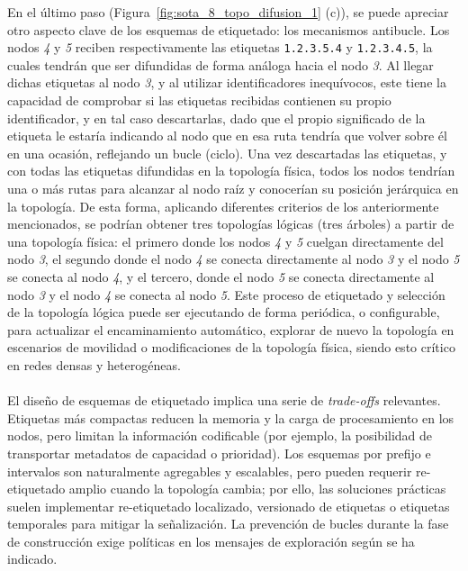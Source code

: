 En el último paso (Figura~\ref{fig:sota_8_topo_difusion_1} (c)), se puede apreciar otro aspecto clave de los esquemas de etiquetado: los mecanismos antibucle. Los nodos \textit{4} y \textit{5} reciben respectivamente las etiquetas \texttt{1.2.3.5.4} y \texttt{1.2.3.4.5}, la cuales tendrán que ser difundidas de forma análoga hacia el nodo \textit{3}. Al llegar dichas etiquetas al nodo \textit{3}, y al utilizar identificadores inequívocos, este tiene la capacidad de comprobar si las etiquetas recibidas contienen su propio identificador, y en tal caso descartarlas, dado que el propio significado de la etiqueta le estaría indicando al nodo que en esa ruta tendría que volver sobre él en una ocasión, reflejando un bucle (ciclo). Una vez descartadas las etiquetas, y con todas las etiquetas difundidas en la topología física, todos los nodos tendrían una o más rutas para alcanzar al nodo raíz y conocerían su posición jerárquica en la topología. De esta forma, aplicando diferentes criterios de los anteriormente mencionados, se podrían obtener tres topologías lógicas (tres árboles) a partir de una topología física: el primero donde los nodos \textit{4} y \textit{5} cuelgan directamente del nodo \textit{3}, el segundo donde el nodo \textit{4} se conecta directamente al nodo \textit{3} y el nodo \textit{5} se conecta al nodo \textit{4}, y el tercero, donde el nodo \textit{5} se conecta directamente al nodo \textit{3} y el nodo \textit{4} se conecta al nodo \textit{5}. Este proceso de etiquetado y selección de la topología lógica puede ser ejecutando de forma periódica, o configurable, para actualizar el encaminamiento automático, explorar de nuevo la topología en escenarios de movilidad o modificaciones de la topología física, siendo esto crítico en redes densas y heterogéneas.\\
\\
El diseño de esquemas de etiquetado implica una serie de \textit{trade-offs} relevantes. Etiquetas más compactas reducen la memoria y la carga de procesamiento en los nodos, pero limitan la información codificable (por ejemplo, la posibilidad de transportar metadatos de capacidad o prioridad). Los esquemas por prefijo e intervalos son naturalmente agregables y escalables, pero pueden requerir re-etiquetado amplio cuando la topología cambia; por ello, las soluciones prácticas suelen implementar re-etiquetado localizado, versionado de etiquetas o etiquetas temporales para mitigar la señalización. La prevención de bucles durante la fase de construcción exige políticas en los mensajes de exploración según se ha indicado.\\
